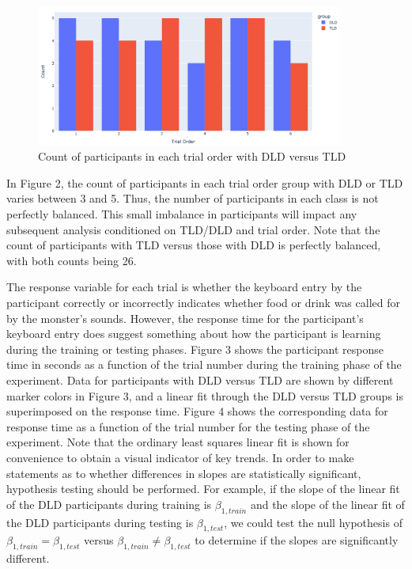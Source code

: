 \documentclass[
  letterpaper,
]{report}
\begin{document}
\begin{figure}

{\centering \includegraphics[width=0.9\textwidth,height=\textheight]{../../visualization/count_trialorder_participants.png}

}

\caption{Count of participants in each trial order with DLD versus TLD}

\end{figure}

In Figure 2, the count of participants in each trial order group with
DLD or TLD varies between 3 and 5. Thus, the number of participants in
each class is not perfectly balanced. This small imbalance in
participants will impact any subsequent analysis conditioned on TLD/DLD
and trial order. Note that the count of participants with TLD versus
those with DLD is perfectly balanced, with both counts being 26.

The response variable for each trial is whether the keyboard entry by
the participant correctly or incorrectly indicates whether food or drink
was called for by the monster's sounds. However, the response time for
the participant's keyboard entry does suggest something about how the
participant is learning during the training or testing phases. Figure 3
shows the participant response time in seconds as a function of the
trial number during the training phase of the experiment. Data for
participants with DLD versus TLD are shown by different marker colors in
Figure 3, and a linear fit through the DLD versus TLD groups is
superimposed on the response time. Figure 4 shows the corresponding data
for response time as a function of the trial number for the testing
phase of the experiment. Note that the ordinary least squares linear fit
is shown for convenience to obtain a visual indicator of key trends. In
order to make statements as to whether differences in slopes are
statistically significant, hypothesis testing should be performed. For
example, if the slope of the linear fit of the DLD participants during
training is \(\beta_{1,train}\) and the slope of the linear fit of the
DLD participants during testing is \(\beta_{1,test}\), we could test the
null hypothesis of \(\beta_{1,train}=\beta_{1,test}\) versus
\(\beta_{1,train} \neq \beta_{1,test}\) to determine if the slopes are
significantly different.
\end{document}
